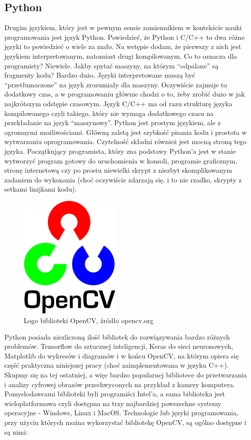 \documentclass{article}
\begin{document}
	\subsection{Python}
	Drugim językiem, który jest w pewnym sensie zamiennikiem w kontekście nauki programowania jest język Python. Powiedzieć, że Python i C/C++ to dwa różne języki to powiedzieć o wiele za mało. Na wstępie dodam, że pierwszy z nich jest językiem interpretowanym, natomiast drugi kompilowanym. Co to oznacza dla programisty? Niewiele. Jakby spytać maszyny, na którym “odpalane” są fragmenty kodu? Bardzo dużo. Języki interpretowane muszą być “przetłumaczone” na język zrozumiały dla maszyny. Oczywiście zajmuje to dodatkowy czas, a w programowaniu głównie chodzi o to, żeby zrobić dużo w jak najkrótszym odstępie czasowym. Język C/C++ ma od razu strukturę języka kompilowanego czyli takiego, który nie wymaga dodatkowego czasu na przekładanie na język “maszynowy”. Python jest prostym językiem, ale z ogromnymi możliwościami. Główną zaletą jest szybkość pisania kodu i prostota w wytwarzaniu oprogramowania. Czytelność składni również jest mocną stroną tego języka. Początkujący programista, który zna podstawy Python’a jest w stanie wytworzyć program gotowy do uruchomienia w konsoli, programie graficznym, stronę internetową czy po prostu niewielki skrypt z niezbyt skomplikowanym zadaniem do wykonania (choć oczywiście zdarzają się, i to nie rzadko, skrypty z setkami linijkami kodu).
	\begin{figure}
		\centering
		\includegraphics[width=5cm]{opencv}
		\caption{Logo biblioteki OpenCV, źródło opencv.org}
	\end{figure}
	\par
	Python posiada niezliczoną ilość bibliotek do rozwiązywania bardzo różnych problemów. Tensorflow do sztucznej inteligencji, Keras do sieci neuronowych, Matplotlib do wykresów i diagramów i w końcu OpenCV, na którym opiera się część praktyczna niniejszej pracy (choć zaimplementowana w języku C++). Skupmy się na tej ostatniej, a więc bardzo popularnej bibliotece do przetwarzania i analizy cyfrowej obrazów przechwyconych na przykład z kamery komputera. Pomysłodawcami biblioteki byli programiści Intel’a, a sama biblioteka jest wieloplatformowa czyli dostępna na trzy najbardziej powszechne systemy operacyjne - Windows, Linux i MacOS. Technologie lub języki programowania, przy użyciu których można wykorzystać bibliotekę OpenCV, są ogólno dostępne i są nimi:
\end{document}
